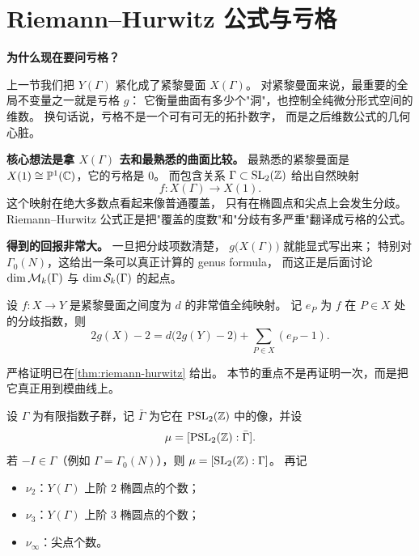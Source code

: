 \section{Riemann--Hurwitz 公式与亏格}
\label{sec:riemann-hurwitz}

\textbf{为什么现在要问亏格？}

上一节我们把 $Y(\Gamma)$ 紧化成了紧黎曼面 $X(\Gamma)$。
对紧黎曼面来说，最重要的全局不变量之一就是亏格 $g$：
它衡量曲面有多少个"洞"，也控制全纯微分形式空间的维数。
换句话说，亏格不是一个可有可无的拓扑数字，
而是之后维数公式的几何心脏。

\textbf{核心想法是拿 $X(\Gamma)$ 去和最熟悉的曲面比较。}
最熟悉的紧黎曼面是
$X(1)\cong\mathbb{P}^1(\mathbb{C})$，它的亏格是 $0$。
而包含关系 $\Gamma\subset \mathrm{SL}_2(\mathbb{Z})$ 给出自然映射
\[
  f\colon X(\Gamma)\longrightarrow X(1).
\]
这个映射在绝大多数点看起来像普通覆盖，
只有在椭圆点和尖点上会发生分歧。
Riemann--Hurwitz 公式正是把"覆盖的度数"和"分歧有多严重"翻译成亏格的公式。

\textbf{得到的回报非常大。}
一旦把分歧项数清楚，
$g\bigl(X(\Gamma)\bigr)$ 就能显式写出来；
特别对 $\Gamma_0(N)$，这给出一条可以真正计算的 genus formula，
而这正是后面讨论 $\dim \mathcal{M}_k(\Gamma)$ 与 $\dim \mathcal{S}_k(\Gamma)$ 的起点。

\begin{theorem}
\label{thm:riemann-hurwitz-recall}
设 $f\colon X\to Y$ 是紧黎曼面之间度为 $d$ 的非常值全纯映射。
记 $e_P$ 为 $f$ 在 $P\in X$ 处的分歧指数，则
\[
  2g(X)-2=d\bigl(2g(Y)-2\bigr)+\sum_{P\in X}(e_P-1).
\]
\end{theorem}

\begin{remark}
严格证明已在\cref{thm:riemann-hurwitz} 给出。
本节的重点不是再证明一次，而是把它真正用到模曲线上。
\end{remark}



\begin{definition}[模曲线亏格公式中的记号]
\label{def:genus-formula-notation}
设 $\Gamma$ 为有限指数子群，记 $\bar\Gamma$ 为它在 $\mathrm{PSL}_2(\mathbb{Z})$ 中的像，并设
\[
  \mu=[\mathrm{PSL}_2(\mathbb{Z}):\bar\Gamma].
\]
若 $-I\in\Gamma$（例如 $\Gamma=\Gamma_0(N)$），则 $\mu=[\mathrm{SL}_2(\mathbb{Z}):\Gamma]$。
再记
\begin{itemize}
  \item $\nu_2$：$Y(\Gamma)$ 上阶 $2$ 椭圆点的个数；
  \item $\nu_3$：$Y(\Gamma)$ 上阶 $3$ 椭圆点的个数；
  \item $\nu_\infty$：尖点个数。
\end{itemize}
\end{definition}

